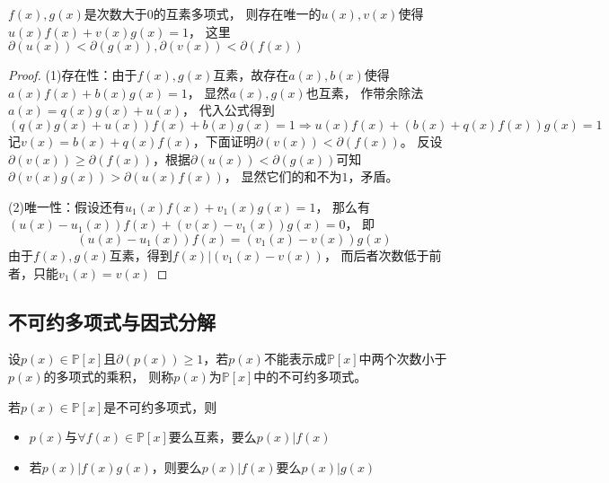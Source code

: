 \begin{exercise}[互素充要条件推广]
  $f(x),g(x)$是次数大于$0$的互素多项式，
  则存在唯一的$u(x),v(x)$使得$u(x)f(x) + v(x)g(x) = 1$，
  这里$\partial(u(x)) < \partial(g(x)), \partial(v(x)) < \partial(f(x))$
\end{exercise}

\begin{proof}
  (1)存在性：由于$f(x),g(x)$互素，故存在$a(x),b(x)$使得$a(x)f(x) + b(x)g(x) = 1$，
  显然$a(x),g(x)$也互素，
  作带余除法
  $a(x) = q(x)g(x) + u(x)$，
  代入公式得到
  \begin{equation*}
    (q(x)g(x) + u(x))f(x) + b(x)g(x) = 1 \Rightarrow u(x)f(x) + (b(x) + q(x)f(x))g(x) = 1
  \end{equation*}
  记$v(x) = b(x) + q(x)f(x)$，下面证明$\partial(v(x)) < \partial(f(x))$。
  反设$\partial(v(x)) \geq \partial(f(x))$，根据$\partial(u(x)) < \partial(g(x))$可知
  $\partial(v(x)g(x)) > \partial(u(x)f(x))$，
  显然它们的和不为$1$，矛盾。
  
  (2)唯一性：假设还有$u_1(x)f(x) + v_1(x)g(x) = 1$，
  那么有$(u(x) - u_1(x))f(x) + (v(x) - v_1(x))g(x) = 0$，
  即
  \begin{equation*}
    (u(x) - u_1(x))f(x) = (v_1(x) - v(x))g(x)
  \end{equation*}
  由于$f(x),g(x)$互素，得到$f(x) \big| (v_1(x) - v(x))$，
  而后者次数低于前者，只能$v_1(x) = v(x)$
\end{proof}


\subsection{不可约多项式与因式分解}

\begin{definition}[不可约多项式]
  设$p(x) \in \mathbb{P}[x]$且$\partial(p(x)) \geq 1$，若$p(x)$不能表示成$\mathbb{P}[x]$中两个次数小于$p(x)$的多项式的乘积，
  则称$p(x)$为$\mathbb{P}[x]$中的不可约多项式。
\end{definition}

\begin{theorem}[不可约多项式的性质]
  若$p(x) \in \mathbb{P}[x]$是不可约多项式，则
  \begin{itemize}
  \item $p(x)$与$\forall f(x) \in \mathbb{P}[x]$要么互素，要么$p(x) \big| f(x)$
  \item 若$p(x)|f(x)g(x)$，则要么$p(x)|f(x)$要么$p(x)|g(x)$
  \end{itemize}
\end{theorem}

